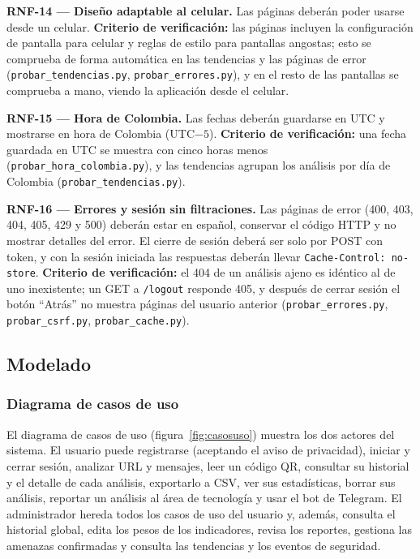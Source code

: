 \documentclass[journal,onecolumn,12pt,draftclsnofoot]{IEEEtran}
\begin{document}
\par\medskip\noindent\textbf{RNF-14 --- Diseño adaptable al celular.} Las páginas deberán poder usarse desde un celular. \textbf{Criterio de verificación:} las páginas incluyen la configuración de pantalla para celular y reglas de estilo para pantallas angostas; esto se comprueba de forma automática en las tendencias y las páginas de error (\texttt{probar\_tendencias.py}, \texttt{probar\_errores.py}), y en el resto de las pantallas se comprueba a mano, viendo la aplicación desde el celular.

\par\medskip\noindent\textbf{RNF-15 --- Hora de Colombia.} Las fechas deberán guardarse en UTC y mostrarse en hora de Colombia (UTC$-5$). \textbf{Criterio de verificación:} una fecha guardada en UTC se muestra con cinco horas menos (\texttt{probar\_hora\_colombia.py}), y las tendencias agrupan los análisis por día de Colombia (\texttt{probar\_tendencias.py}).

\par\medskip\noindent\textbf{RNF-16 --- Errores y sesión sin filtraciones.} Las páginas de error (400, 403, 404, 405, 429 y 500) deberán estar en español, conservar el código HTTP y no mostrar detalles del error. El cierre de sesión deberá ser solo por POST con token, y con la sesión iniciada las respuestas deberán llevar \texttt{Cache-Control: no-store}. \textbf{Criterio de verificación:} el 404 de un análisis ajeno es idéntico al de uno inexistente; un GET a \texttt{/logout} responde 405, y después de cerrar sesión el botón ``Atrás'' no muestra páginas del usuario anterior (\texttt{probar\_errores.py}, \texttt{probar\_csrf.py}, \texttt{probar\_cache.py}).

\subsection{Modelado}

\subsubsection{Diagrama de casos de uso}

El diagrama de casos de uso (figura~\ref{fig:casosuso}) muestra los dos actores del sistema. El usuario puede registrarse (aceptando el aviso de privacidad), iniciar y cerrar sesión, analizar URL y mensajes, leer un código QR, consultar su historial y el detalle de cada análisis, exportarlo a CSV, ver sus estadísticas, borrar sus análisis, reportar un análisis al área de tecnología y usar el bot de Telegram. El administrador hereda todos los casos de uso del usuario y, además, consulta el historial global, edita los pesos de los indicadores, revisa los reportes, gestiona las amenazas confirmadas y consulta las tendencias y los eventos de seguridad.
\end{document}
